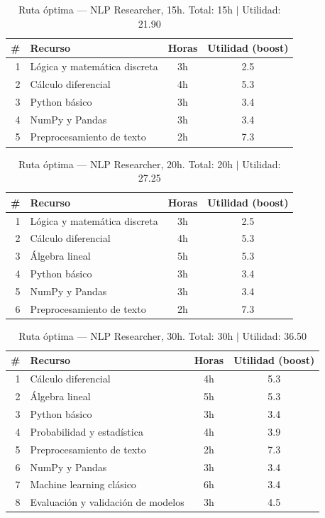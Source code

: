 \documentclass[11pt, a4paper]{article}
\begin{document}
\begin{table}[H]
\centering
\small
\caption{Ruta óptima — NLP Researcher, 15h. Total: 15h $|$ Utilidad: 21.90}
\begin{tabular}{r l c c}
\toprule
\textbf{\#} & \textbf{Recurso} & \textbf{Horas} & \textbf{Utilidad (boost)} \\
\midrule
1 & Lógica y matemática discreta & 3h & 2.5 \\
2 & Cálculo diferencial          & 4h & 5.3 \\
3 & Python básico                & 3h & 3.4 \\
4 & NumPy y Pandas               & 3h & 3.4 \\
5 & Preprocesamiento de texto    & 2h & 7.3 \\
\bottomrule
\end{tabular}
\end{table}

\begin{table}[H]
\centering
\small
\caption{Ruta óptima — NLP Researcher, 20h. Total: 20h $|$ Utilidad: 27.25}
\begin{tabular}{r l c c}
\toprule
\textbf{\#} & \textbf{Recurso} & \textbf{Horas} & \textbf{Utilidad (boost)} \\
\midrule
1 & Lógica y matemática discreta & 3h & 2.5 \\
2 & Cálculo diferencial          & 4h & 5.3 \\
3 & Álgebra lineal               & 5h & 5.3 \\
4 & Python básico                & 3h & 3.4 \\
5 & NumPy y Pandas               & 3h & 3.4 \\
6 & Preprocesamiento de texto    & 2h & 7.3 \\
\bottomrule
\end{tabular}
\end{table}

\begin{table}[H]
\centering
\small
\caption{Ruta óptima — NLP Researcher, 30h. Total: 30h $|$ Utilidad: 36.50}
\begin{tabular}{r l c c}
\toprule
\textbf{\#} & \textbf{Recurso} & \textbf{Horas} & \textbf{Utilidad (boost)} \\
\midrule
1 & Cálculo diferencial                  & 4h & 5.3 \\
2 & Álgebra lineal                       & 5h & 5.3 \\
3 & Python básico                        & 3h & 3.4 \\
4 & Probabilidad y estadística           & 4h & 3.9 \\
5 & Preprocesamiento de texto            & 2h & 7.3 \\
6 & NumPy y Pandas                       & 3h & 3.4 \\
7 & Machine learning clásico             & 6h & 3.4 \\
8 & Evaluación y validación de modelos   & 3h & 4.5 \\
\bottomrule
\end{tabular}
\end{table}
\end{document}
